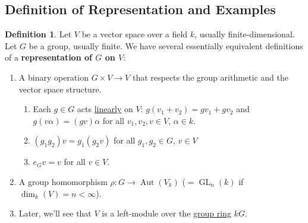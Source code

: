 \documentclass[12pt]{article}
\theoremstyle{definition}
\newtheorem{definition}[theorem]{Definition}
\DeclareMathOperator\Aut{Aut}
\DeclareMathOperator\GL{GL}
\begin{document}
\subsection{Definition of Representation and Examples}
\begin{definition}
    Let $V$ be a vector space over a field $k$, usually finite-dimensional. Let $G$ be a group, usually finite. We have several essentially equivalent definitions of a \textbf{representation of $G$ on $V$}:
    \begin{enumerate}
        \item A binary operation $G\times V\to V$ that respects the group arithmetic and the vector space structure.
        \begin{enumerate}
            \item Each $g\in G$ acts \underline{linearly} on $V$: $g(v_1+v_2)=gv_1+gv_2$ and $g(v\alpha)=(gv)\alpha$ for all $v_1,v_2,v\in V$, $\alpha\in k$.
            \item $(g_1g_2)v=g_1(g_2v)$ for all $g_1,g_2\in G$, $v\in V$
            \item $e_Gv=v$ for all $v\in V$.
        \end{enumerate}
        \item A group homomorphism $\rho:G\to\Aut(V_k)$ ($=\GL_n(k)$ if $\dim_k(V)=n<\infty$).
        \item Later, we'll see that $V$ is a left-module over the \underline{group ring} $kG$.
    \end{enumerate}
\end{definition}
\end{document}
